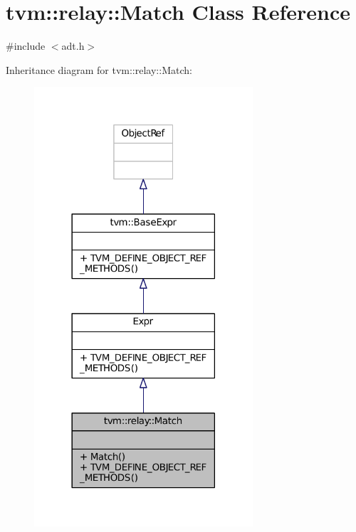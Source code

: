 \hypertarget{classtvm_1_1relay_1_1Match}{}\section{tvm\+:\+:relay\+:\+:Match Class Reference}
\label{classtvm_1_1relay_1_1Match}


{\ttfamily \#include $<$adt.\+h$>$}



Inheritance diagram for tvm\+:\+:relay\+:\+:Match\+:
\nopagebreak
\begin{figure}[H]
\begin{center}
\leavevmode
\includegraphics[width=230pt]{classtvm_1_1relay_1_1Match__inherit__graph}
\end{center}
\end{figure}


